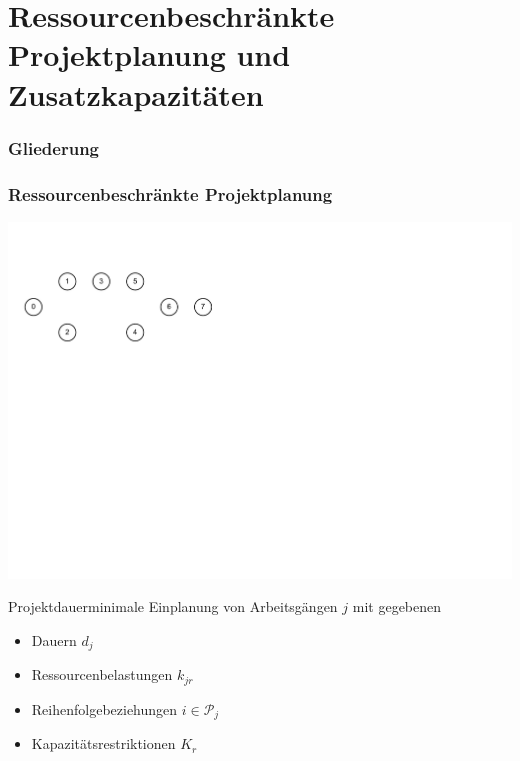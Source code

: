 
\section{Ressourcenbeschränkte Projektplanung und Zusatzkapazitäten}

\begin{frame}[noframenumbering]
\frametitle{Gliederung}
\end{frame}

\begin{frame}[t]
\frametitle{Ressourcenbeschränkte Projektplanung}
\begin{center}
\includegraphics[page=3, width=\textwidth]{images/rcpsp.pdf}\\
\end{center}

{\small
Projektdauerminimale Einplanung von Arbeitsgängen $j$ mit gegebenen
\begin{itemize}
\itemsep0em
\item Dauern $d_j$
\item Ressourcenbelastungen $k_{jr}$
\item Reihenfolgebeziehungen $i \in \mathcal{P}_j$
\item Kapazitätsrestriktionen $K_r$
\end{itemize}
}
\end{frame}


